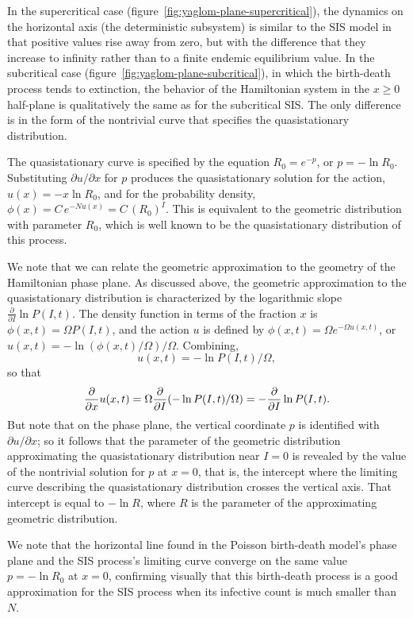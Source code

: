 \documentclass[review]{elsarticle}
\begin{document}
In the supercritical case (figure~\ref{fig:yaglom-plane-supercritical}),
the dynamics on the horizontal axis
(the deterministic subsystem) is similar to the SIS model in that
positive values rise away from zero, but with the difference that
they increase to infinity rather than to a finite endemic equilibrium
value.
In the subcritical case (figure~\ref{fig:yaglom-plane-subcritical}),
in which the birth-death process tends to
extinction, the behavior of the Hamiltonian system
in the $x\geq0$ half-plane is qualitatively
the same as for the subcritical SIS.
The only difference is in the form of the nontrivial curve that specifies
the quasistationary distribution.

The quasistationary curve is specified by the
equation $R_0=e^{-p}$, or $p=-\ln R_0$.
Substituting $\partial u/\partial x$ for $p$
produces the quasistationary solution for the action,
$u(x) = -x\ln R_0$,
and for the probability density,
$\phi(x) = C\,e^{-Nu(x)} = C\,(R_0)^I$.
This is equivalent to the geometric distribution with parameter $R_0$,
which is well known to be the quasistationary distribution of this
process.

We note that we can relate the geometric approximation to the geometry
of the Hamiltonian phase plane.
As discussed above, the geometric approximation to the quasistationary
distribution is characterized by the logarithmic slope
$\frac{\partial}{\partial I}\ln P(I,t)$.
The density function in terms of the fraction $x$ is
$\phi(x,t) = \Omega P(I,t)$, and the action $u$ is defined by
$\phi(x,t) = \Omega e^{-\Omega u(x,t)}$, or
$u(x,t) = -\ln (\phi(x,t)/\Omega)/\Omega$.
Combining,
\[ u(x,t) = -\ln P(I,t) / \Omega, \]
so that
\begin{dmath*}
  \frac{\partial}{\partial x} u(x,t)
    = \Omega \frac{\partial}{\partial I} (-\ln P(I,t) / \Omega) \\
    = - \frac{\partial}{\partial I}\ln P(I,t).
\end{dmath*}
But note that on the phase plane, the vertical coordinate $p$ is
identified with $\partial u/\partial x$;
so it follows that the parameter of the geometric distribution
approximating the quasistationary distribution near $I=0$
is revealed by the value of the nontrivial solution for $p$ at $x=0$,
that is, the
intercept where the limiting curve describing the quasistationary
distribution crosses the vertical axis.
That intercept is equal to $-\ln R$, where $R$ is the parameter
of the approximating geometric distribution.

We note that the horizontal line found in the Poisson birth-death model's
phase plane and the SIS process's limiting
curve converge on the same value $p=-\ln R_0$ at $x=0$, confirming visually
that this birth-death process is a good approximation for the SIS process
when its infective count is much smaller than $N$.
\end{document}
